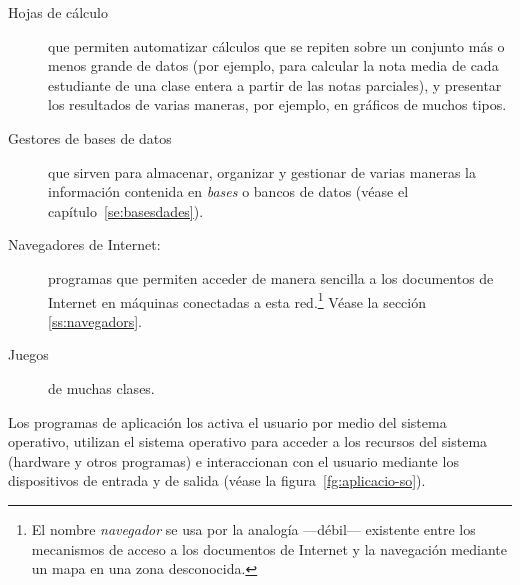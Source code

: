 \begin{description}
\begin{description}
\begin{description}
\item[Hojas de cálculo] que permiten automatizar cálculos que se repiten sobre un conjunto más o menos grande de datos (por ejemplo, para calcular la nota media de cada estudiante de una clase entera a partir de las notas parciales), y presentar los resultados de varias maneras, por ejemplo, en gráficos de muchos tipos. \item[Gestores de bases de datos] \label{pg:BD} que sirven para almacenar, organizar y gestionar de varias maneras la información contenida en \emph{bases} o bancos de datos (véase el capítulo~\ref{se:basesdades}). 

\item[Navegadores de Internet:] \label{pg:navegadors} programas que permiten acceder de manera sencilla a los documentos de Internet en máquinas conectadas a esta red.\footnote{El nombre \emph{navegador} se usa por la analogía ---débil--- existente entre los mecanismos de acceso a los documentos de Internet y la navegación mediante un mapa en una zona desconocida.} Véase la sección \ref{ss:navegadors}. 

\item[Juegos] de muchas clases. \end{description} \end{description} Los programas de aplicación los activa el usuario por medio del sistema operativo, utilizan el sistema operativo para acceder a los recursos del sistema (hardware y otros programas) e interaccionan con el usuario mediante los dispositivos de entrada y de salida (véase la figura~\ref{fg:aplicacio-so}). \end{description} 

